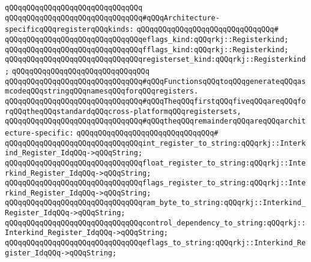 \verb|qQQqqQQqqQQqqQQqqQQqqQQqqQQqqQQq|\newline
\verb|qQQqqQQqqQQqqQQqqQQqqQQqqQQqqQQq#qQQqArchitecture-specificqQQqregisterqQQqkinds:|\newline
\verb|qQQqqQQqqQQqqQQqqQQqqQQqqQQqqQQq#|\newline
\verb|qQQqqQQqqQQqqQQqqQQqqQQqqQQqqQQqeflags_kind:qQQqrkj::Registerkind;|\newline
\newline
\verb|qQQqqQQqqQQqqQQqqQQqqQQqqQQqqQQqfflags_kind:qQQqrkj::Registerkind;|\newline
\newline
\verb|qQQqqQQqqQQqqQQqqQQqqQQqqQQqqQQqregisterset_kind:qQQqrkj::Registerkind;|\newline
\newline
\verb|qQQqqQQqqQQqqQQqqQQqqQQqqQQqqQQq|\newline
\verb|qQQqqQQqqQQqqQQqqQQqqQQqqQQqqQQq#qQQqFunctionsqQQqtoqQQqgenerateqQQqasmcodeqQQqstringqQQqnamesqQQqforqQQqregisters.|\newline
\verb|qQQqqQQqqQQqqQQqqQQqqQQqqQQqqQQq#qQQqTheqQQqfirstqQQqfiveqQQqareqQQqforqQQqtheqQQqstandardqQQqcross-platformqQQqregistersets,|\newline
\verb|qQQqqQQqqQQqqQQqqQQqqQQqqQQqqQQq#qQQqtheqQQqremainderqQQqareqQQqarchitecture-specific:|\newline
\verb|qQQqqQQqqQQqqQQqqQQqqQQqqQQqqQQq#|\newline
\verb|qQQqqQQqqQQqqQQqqQQqqQQqqQQqqQQqint_register_to_string:qQQqrkj::Interkind_Register_IdqQQq->qQQqString;|\newline
\newline
\verb|qQQqqQQqqQQqqQQqqQQqqQQqqQQqqQQqfloat_register_to_string:qQQqrkj::Interkind_Register_IdqQQq->qQQqString;|\newline
\newline
\verb|qQQqqQQqqQQqqQQqqQQqqQQqqQQqqQQqflags_register_to_string:qQQqrkj::Interkind_Register_IdqQQq->qQQqString;|\newline
\newline
\verb|qQQqqQQqqQQqqQQqqQQqqQQqqQQqqQQqram_byte_to_string:qQQqrkj::Interkind_Register_IdqQQq->qQQqString;|\newline
\newline
\verb|qQQqqQQqqQQqqQQqqQQqqQQqqQQqqQQqcontrol_dependency_to_string:qQQqrkj::Interkind_Register_IdqQQq->qQQqString;|\newline
\newline
\verb|qQQqqQQqqQQqqQQqqQQqqQQqqQQqqQQqeflags_to_string:qQQqrkj::Interkind_Register_IdqQQq->qQQqString;|\newline

